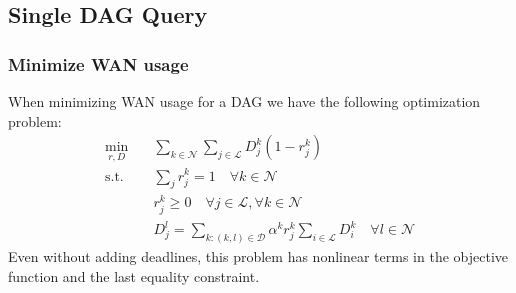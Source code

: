 \subsection{Single DAG Query}
\subsubsection*{Minimize WAN usage}

When minimizing WAN usage for a DAG we have the following optimization problem:
\begin{subequations}
	\begin{align}
		\min_{r,D} \quad & \sum_{k\in\mathcal{N}}\sum_{j\in\mathcal{L}}D_j^k(1-r_j^k) \\
		\text{s.t.} \quad & \sum_{j}r_j^k = 1 \quad \forall k\in\mathcal{N}\\
		& r_j^k \geq 0 \quad \forall j\in\mathcal{L},\forall k\in\mathcal{N} \\
		& D_j^l = \sum_{k:(k,l)\in\mathcal{D}}\alpha^kr_j^k\sum_{i\in\mathcal{L}}D_i^k \quad \forall l\in\mathcal{N}
	\end{align}
\end{subequations}
Even without adding deadlines, this problem has nonlinear terms in the objective function and the last equality constraint.